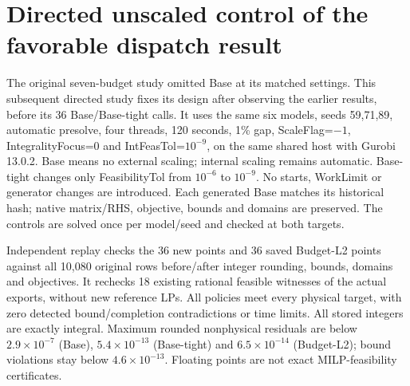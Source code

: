 \documentclass[11pt]{article}
\begin{document}
\section{Directed unscaled control of the favorable dispatch result}
\label{sec:si-base-controls}
The original seven-budget study omitted Base at its matched settings. This
subsequent directed study fixes its design after observing the earlier results,
before its 36 Base/Base-tight calls. It uses the same six models, seeds 59,71,89,
automatic presolve, four threads, 120 seconds, 1\% gap, ScaleFlag=$-1$,
IntegralityFocus=0 and IntFeasTol=$10^{-9}$, on the same shared host with
Gurobi 13.0.2. Base means no external scaling; internal scaling remains automatic.
Base-tight changes only FeasibilityTol from $10^{-6}$ to $10^{-9}$. No starts,
WorkLimit or generator changes are introduced. Each generated Base matches its
historical hash; native matrix/RHS, objective, bounds and domains are preserved.
The controls are solved once per model/seed and checked at both targets.

Independent replay checks the 36 new points and 36 saved Budget-L2 points against
all 10,080 original rows before/after integer rounding, bounds, domains and
objectives. It rechecks 18 existing rational feasible witnesses of the actual
exports, without new reference LPs. All policies meet every physical target,
with zero detected bound/completion contradictions or time limits. All stored
integers are exactly integral. Maximum rounded nonphysical residuals are below
$2.9\times10^{-7}$ (Base), $5.4\times10^{-13}$ (Base-tight) and
$6.5\times10^{-14}$ (Budget-L2); bound violations stay below
$4.6\times10^{-13}$. Floating points are not exact MILP-feasibility certificates.

\begin{table}[tb]
\centering\small\setlength{\tabcolsep}{3pt}
\caption{Directed comparison: B is Budget-L2 and C is the named control.
Both pass counts pairs meeting every rounded target at 0.01 MW and the listed
volume budget, in m\textsuperscript{3}. Ratios are geometric means of 18 pairs.
Max cost is the maximum $100(C_{\rm B}-C_{\rm C})/|C_{\rm C}|$ of recomputed
candidate costs, not certified gaps. Initial work uses 36 new controls and
36 saved Budget-L2 calls; their times are not combined. The interleaved panel
uses contemporaneous fresh-process repeats. All logs and points are retained.}
\label{tab:base-controls}
\resizebox{\linewidth}{!}{}
\end{table}
\end{document}
